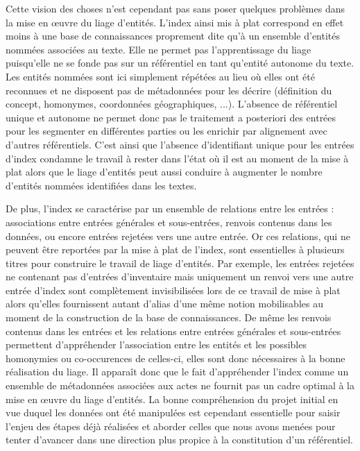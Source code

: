 \documentclass[a4paper,12pt,twoside]{book}
\begin{document}
	Cette vision des choses n'est cependant pas sans poser quelques problèmes dans la mise en œuvre du liage d'entités. L'index ainsi mis à plat correspond en effet moins à une base de connaissances proprement dite qu'à un ensemble d'entités nommées associées au texte. Elle ne permet pas l'apprentissage du liage puisqu'elle ne se fonde pas sur un référentiel en tant qu'entité autonome du texte. Les entités nommées sont ici simplement répétées au lieu où elles ont été reconnues et ne disposent pas de métadonnées pour les décrire (définition du concept, homonymes, coordonnées géographiques, ...). L'absence de référentiel unique et autonome ne permet donc pas le traitement a posteriori des entrées pour les segmenter en différentes parties ou les enrichir par alignement avec d'autres référentiels. C'est ainsi que l'absence d'identifiant unique pour les entrées d'index condamne le travail à rester dans l'état où il est au moment de la mise à plat alors que le liage d'entités peut aussi conduire à augmenter le nombre d'entités nommées identifiées dans les textes.
	
	De plus, l'index se caractérise par un ensemble de relations entre les entrées : associations entre entrées générales et sous-entrées, renvois contenus dans les données, ou encore entrées rejetées vers une autre entrée. Or ces relations, qui ne peuvent être reportées par la mise à plat de l'index, sont essentielles à plusieurs titres pour construire le travail de liage d'entités.  Par exemple, les entrées rejetées ne contenant pas d'entrées d'inventaire mais uniquement un renvoi vers une autre entrée d'index sont complètement invisibilisées lors de ce travail de mise à plat alors qu'elles fournissent autant d'alias d'une même notion mobilisables au moment de la construction de la base de connaissances. De même les renvois contenus dans les entrées et les relations entre entrées générales et sous-entrées permettent d'appréhender l'association entre les entités et les possibles homonymies ou co-occurences de celles-ci, elles sont donc nécessaires à la bonne réalisation du liage. Il apparaît donc que le fait d'appréhender l'index comme un ensemble de métadonnées associées aux actes ne fournit pas un cadre optimal à la mise en œuvre du liage d'entités. La bonne compréhension du projet initial en vue duquel les données ont été manipulées est cependant essentielle pour saisir l'enjeu des étapes déjà réalisées et aborder celles que nous avons menées pour tenter d'avancer dans une direction plus propice à la constitution d'un référentiel.
	
\end{document}
